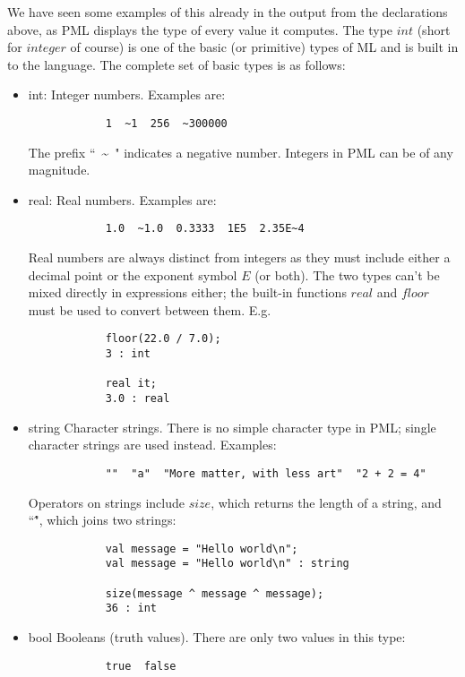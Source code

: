 We have seen some examples of this already in the output from the
declarations above, as PML displays the type of every value it computes.
The type $int$ (short for $integer$ of course) is one of the basic (or
primitive) types of ML and is built in to the language. The complete set
of basic types is as follows:
\begin{itemize}
\item
    int:
        Integer numbers. Examples are:
\begin{verbatim}
            1  ~1  256  ~300000
\end{verbatim}

        The prefix ``~\~~" indicates a negative number. Integers in PML can
        be of any magnitude.

\item    real:
        Real numbers. Examples are:
\begin{verbatim}
            1.0  ~1.0  0.3333  1E5  2.35E~4
\end{verbatim}

        Real numbers are always distinct from integers as they must
        include either a decimal point or the exponent symbol $E$ (or
        both). The two types can't be mixed directly in expressions
        either; the built-in functions $real$ and $floor$ must be used
        to convert between them. E.g.
\begin{verbatim}
            floor(22.0 / 7.0);
            3 : int

            real it;
            3.0 : real
\end{verbatim}

\item    string
        Character strings. There is no simple character type in PML;
        single character strings are used instead. Examples:
 \begin{verbatim}
            ""  "a"  "More matter, with less art"  "2 + 2 = 4"
\end{verbatim}

        Operators on strings include $size$, which returns the length of
        a string, and ``\^", which joins two strings:
\begin{verbatim}
            val message = "Hello world\n";
            val message = "Hello world\n" : string

            size(message ^ message ^ message);
            36 : int
\end{verbatim}

\item    bool
        Booleans (truth values). There are only two values in this type:
\begin{verbatim}
            true  false
\end{verbatim}


\end{itemize}
